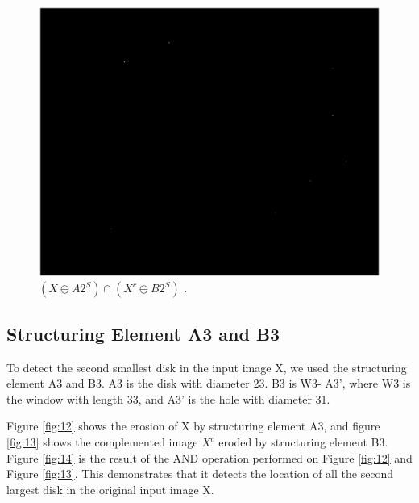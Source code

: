 \documentclass[paper=a4, fontsize=11pt]{scrartcl}
\begin{document}
\begin{figure}
	\centering
	\includegraphics[width=12cm]{MiddleDisk_central_points.eps}
	\caption{ $( X \ominus A2^S) \cap ( X^c \ominus B2^S)$ .}
	\label{fig:11}
\end{figure}






\subsection{Structuring Element A3 and B3}


To detect the second smallest disk in the input image X, we used the structuring element A3 and B3. A3 is the disk with diameter 23. B3 is W3- A3', where W3 is the window with length 33, and A3' is the hole with diameter 31.

Figure \ref{fig:12} shows the erosion of X by structuring element A3, and figure \ref{fig:13} shows the complemented image $X^c$ eroded by structuring element B3. Figure \ref{fig:14} is the result of the AND operation performed on Figure \ref{fig:12} and Figure \ref{fig:13}. This demonstrates that it detects the location of all the second largest disk in the original input image X.
\end{document}
